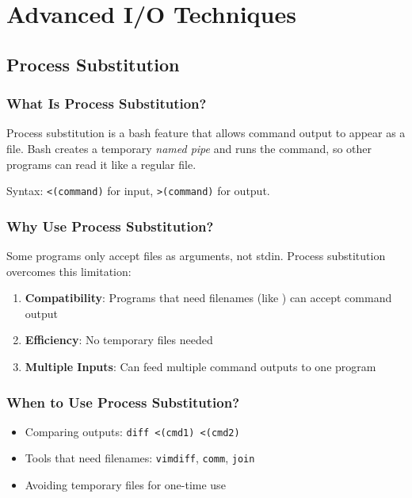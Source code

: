 \section{Advanced I/O Techniques}
\label{sec:advanced-io}

\subsection{Process Substitution}

\subsubsection{What Is Process Substitution?}

Process substitution is a bash feature that allows command output to appear as a file. Bash creates a temporary \textit{named pipe} and runs the command, so other programs can read it like a regular file.

Syntax: \texttt{<(command)} for input, \texttt{>(command)} for output.

\subsubsection{Why Use Process Substitution?}

Some programs only accept files as arguments, not stdin. Process substitution overcomes this limitation:

\begin{enumerate}
	\item \textbf{Compatibility}: Programs that need filenames (like ) can accept command output
	\item \textbf{Efficiency}: No temporary files needed
	\item \textbf{Multiple Inputs}: Can feed multiple command outputs to one program
\end{enumerate}

\subsubsection{When to Use Process Substitution?}

\begin{itemize}
	\item Comparing outputs: \texttt{diff <(cmd1) <(cmd2)}
	\item Tools that need filenames: \texttt{vimdiff}, \texttt{comm}, \texttt{join}
	\item Avoiding temporary files for one-time use
\end{itemize}

